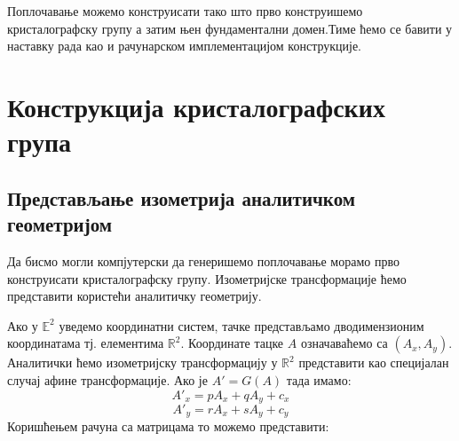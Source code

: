 \documentclass[12pt]{report}
\newtheorem{definition}[theorem]{\bf Дефиниција}
\begin{document}
Поплочавање можемо конструисати тако што прво конструишемо кристалографску групу а затим њен фундаментални домен.Тиме ћемо се бавити у наставку рада као и рачунарском имплементацијом конструкције.






    \chapter{\texorpdfstring{Конструкција кристалографских група
}{Izometrijske transformacije u \textbackslash{}mathbb\{Е\}\^{}2}}\label{izometrijske-transformacije-u-mathbbr2}
\section{Представљање изометрија аналитичком геометријом}

Да бисмо могли компјутерски да генеришемо поплочавање морамо прво конструисати кристалографску групу. Изометријске трансформације ћемо представити користећи аналитичку геометрију.




    Ако у \(\mathbb{E}^2\) уведемо координатни систем, тачке представљамо
дводимензионим координатама тј. елементима \(\mathbb{R}^2\). Координате
тацке \(A\) означаваћемо са \((A_x, A_y)\). Аналитички ћемо изометријску
трансформацију у \(\mathbb{R}^2\) представити као специјалан случај
афине трансформације. Ако је \(A' = G(A)\) тада имамо:
\[A'_x = pA_x + qA_y + c_x\] \[A'_y = rA_x + sA_y + c_y\] Коришћењем
рачуна са матрицама то можемо представити:
\end{document}

